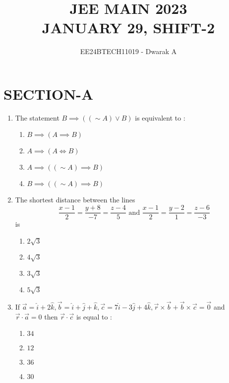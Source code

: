 \documentclass[journal,12pt,twocolumn]{IEEEtran}
\theoremstyle{remark}
\begin{document}

\vspace{3cm}

\title{\textbf{JEE MAIN 2023\\JANUARY 29, SHIFT-2}}
\author{EE24BTECH11019 - Dwarak A}
\maketitle
\newpage
\bigskip

\renewcommand{\thefigure}{\theenumi}
\renewcommand{\thetable}{\theenumi}

\section*{\textbf{SECTION-A}}
\bigskip

\begin{enumerate}
    \item The statement $B\implies((\sim A)\vee B)$ is equivalent to : 
        \begin{enumerate}
            \item $B\implies(A \implies B)$
            \item $A \implies(A \iff B)$
            \item $A \implies((\sim A)\implies B)$
            \item $B \implies((\sim A)\implies B)$
        \end{enumerate}
    
    \item The shortest distance between the lines $$\frac{x-1}{2}=\frac{y+8}{-7}=\frac{z-4}{5} \text{ and } \frac{x-1}{2}=\frac{y-2}{1}=\frac{z-6}{-3}$$ is
        \begin{enumerate}
            \item $2\sqrt{3}$
            \item $4\sqrt{3}$
            \item $3\sqrt{3}$
            \item $5\sqrt{3}$
        \end{enumerate}
    
    \item If $\vec{a}=\hat{i}+2\hat{k},\vec{b}=\hat{i}+\hat{j}+\hat{k},\vec{c}=7\hat{i}-3\hat{j}+4\hat{k},\vec{r}\times\vec{b}+\vec{b}\times\vec{c}=\vec{0}$ and $\vec{r}\cdot\vec{a}=0$ then $\vec{r}\cdot\vec{c}$ is equal to :
        \begin{enumerate}
            \item $34$
            \item $12$
            \item $36$
            \item $30$
        \end{enumerate}


\end{enumerate}
\end{document}
